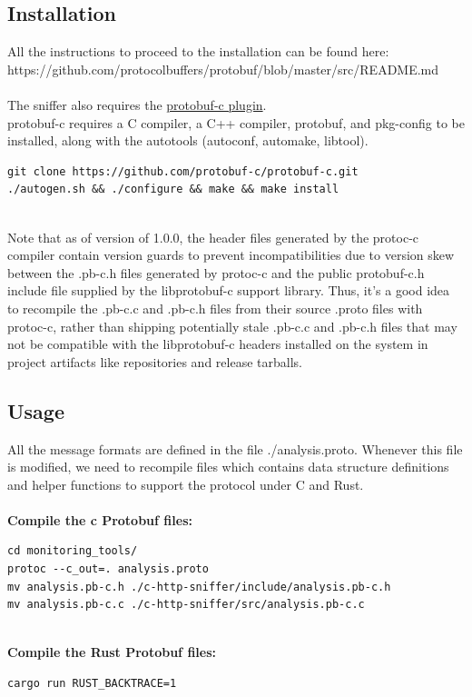 \documentclass[12pt,hidelinks]{article}
\begin{document}
\subsection{Installation}
All the instructions to proceed to the installation can be found here: \\
https://github.com/protocolbuffers/protobuf/blob/master/src/README.md \\
\\
The sniffer also requires the \href{https://github.com/protobuf-c/protobuf-c}{protobuf-c plugin}. \\
protobuf-c requires a C compiler, a C++ compiler, protobuf, and pkg-config to be installed, along with the autotools (autoconf, automake, libtool).
\begin{verbatim}
git clone https://github.com/protobuf-c/protobuf-c.git
./autogen.sh && ./configure && make && make install
\end{verbatim}
\\
Note that as of version of 1.0.0, the header files generated by the protoc-c compiler contain version guards to prevent incompatibilities due to version skew between the .pb-c.h files generated by protoc-c and the public protobuf-c.h include file supplied by the libprotobuf-c support library. 
Thus, it's a good idea to recompile the .pb-c.c and .pb-c.h files from their source .proto files with protoc-c, rather than shipping potentially stale .pb-c.c and .pb-c.h files that may not be compatible with the libprotobuf-c headers installed on the system in project artifacts like repositories and release tarballs. 

\subsection{Usage}
All the message formats are defined in the file ./analysis.proto. Whenever this file is modified, we need to recompile files which contains data structure definitions and helper functions to support the protocol under C and Rust. \\
\\
\textbf{Compile the c Protobuf files:}
\begin{verbatim}
cd monitoring_tools/
protoc --c_out=. analysis.proto
mv analysis.pb-c.h ./c-http-sniffer/include/analysis.pb-c.h
mv analysis.pb-c.c ./c-http-sniffer/src/analysis.pb-c.c
\end{verbatim}
\\
\textbf{Compile the Rust Protobuf files:}
\begin{verbatim}
cargo run RUST_BACKTRACE=1 
\end{verbatim}
\end{document}
